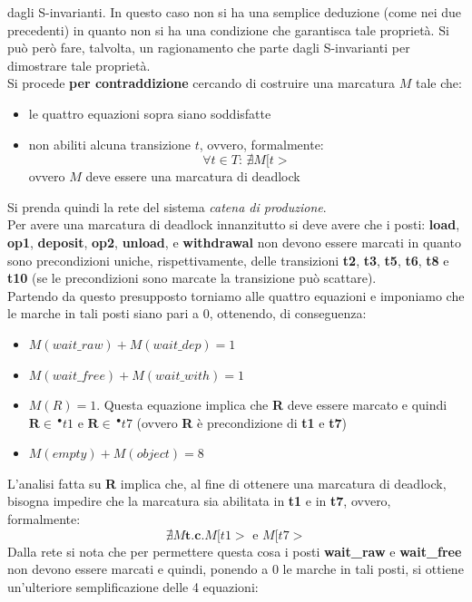 \documentclass[a4paper,12pt, oneside]{book}
\begin{document}
\begin{esempio}
  dagli S-invarianti. In questo caso non si ha una semplice deduzione (come nei
  due precedenti) in quanto non si ha una condizione che garantisca tale
  proprietà. Si può però fare, talvolta, un ragionamento che parte dagli
  S-invarianti per dimostrare tale proprietà.\\
  Si procede \textbf{per contraddizione} cercando di costruire una marcatura $M$
  tale che:
  \begin{itemize}
    \item le quattro equazioni sopra siano soddisfatte
    \item non abiliti alcuna transizione $t$, ovvero, formalmente:
    \[\forall t\in T:\,\nexists M[t>\]
    ovvero $M$ deve essere una marcatura di deadlock
  \end{itemize}
  Si prenda quindi la rete del sistema \emph{catena di produzione}.
  \\
  Per avere una marcatura di deadlock innanzitutto si deve avere che i
  posti: \textbf{load}, \textbf{op1}, \textbf{deposit}, \textbf{op2},
  \textbf{unload}, e \textbf{withdrawal} non devono essere marcati in quanto
  sono precondizioni uniche, rispettivamente, delle transizioni \textbf{t2},
  \textbf{t3}, \textbf{t5}, \textbf{t6}, \textbf{t8} e \textbf{t10} (se le
  precondizioni sono marcate la transizione può scattare).\\
  Partendo da questo presupposto torniamo alle quattro equazioni e imponiamo che
  le marche in tali posti siano pari a 0, ottenendo, di conseguenza:
  \begin{itemize}
    \item $M(wait\_raw) + M(wait\_dep) = 1$
    \item $M(wait\_free) + M(wait\_with) = 1$
    \item $M(R) = 1$. Questa equazione implica che \textbf{R} deve essere
    marcato e quindi $\mathbf{R}\in \,^\bullet t1$ e $\mathbf{R}\in \,^\bullet
    t7$ (ovvero \textbf{R} è precondizione di \textbf{t1} e \textbf{t7})
    \item $M(empty) + M(object) = 8$
  \end{itemize}
  L'analisi fatta su \textbf{R} implica che, al fine di ottenere una marcatura
  di deadlock, bisogna impedire che la marcatura sia abilitata in \textbf{t1} e
  in \textbf{t7}, ovvero, formalmente:
  \[\nexists M \mathbf{ t.c. } M[t1> \mbox{ e } M[t7>\]
  Dalla rete si nota che per permettere questa cosa i posti \textbf{wait\_raw} e
  \textbf{wait\_free} non devono essere marcati e quindi, ponendo a 0 le marche
  in tali posti, si ottiene un'ulteriore semplificazione delle 4 equazioni:

\end{esempio}
\end{document}
